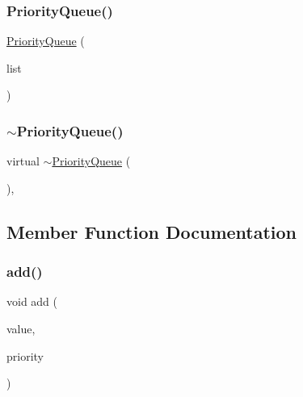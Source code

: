 \subsubsection{\texorpdfstring{Priority\+Queue()}{PriorityQueue()}\hspace{0.1cm}{\footnotesize\ttfamily [2/2]}}
{\footnotesize\ttfamily \mbox{\hyperlink{classPriorityQueue}{Priority\+Queue}} (\begin{DoxyParamCaption}\item[{std\+::initializer\+\_\+list$<$ std\+::pair$<$ double, Value\+Type $>$$>$}]{list }\end{DoxyParamCaption})}

\mbox{\label{classPriorityQueue_afc663d44a2c1d9789bafb284407e6ee2}} 
\subsubsection{\texorpdfstring{$\sim$\+Priority\+Queue()}{~PriorityQueue()}}
{\footnotesize\ttfamily virtual $\sim$\mbox{\hyperlink{classPriorityQueue}{Priority\+Queue}} (\begin{DoxyParamCaption}{ }\end{DoxyParamCaption})\hspace{0.3cm}{\ttfamily [virtual]}, {\ttfamily [default]}}



\subsection{Member Function Documentation}
\mbox{\label{classPriorityQueue_aa604cec721b985421df5448c531a4482}} 
\subsubsection{\texorpdfstring{add()}{add()}}
{\footnotesize\ttfamily void add (\begin{DoxyParamCaption}\item[{const Value\+Type \&}]{value,  }\item[{double}]{priority }\end{DoxyParamCaption})}

